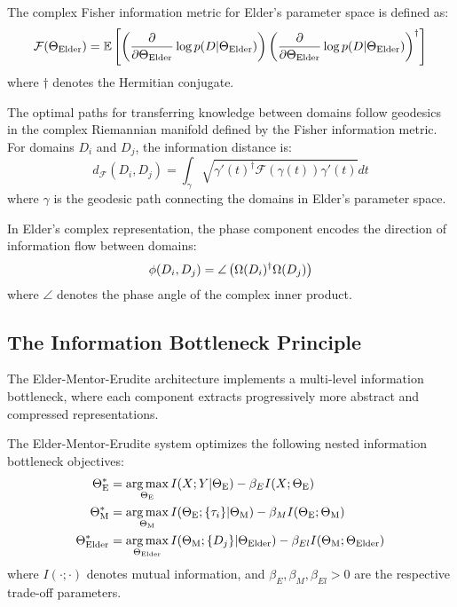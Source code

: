 \begin{definition}
The complex Fisher information metric for Elder's parameter space is defined as:
\begin{equation}
\mathcal{F}(\Theta_{\text{Elder}}) = \mathbb{E}\left[ \left(\frac{\partial}{\partial \Theta_{\text{Elder}}} \log p(D | \Theta_{\text{Elder}})\right) \left(\frac{\partial}{\partial \Theta_{\text{Elder}}} \log p(D | \Theta_{\text{Elder}})\right)^{\dagger} \right]
\end{equation}
where $\dagger$ denotes the Hermitian conjugate.
\end{definition}

\begin{theorem}
The optimal paths for transferring knowledge between domains follow geodesics in the complex Riemannian manifold defined by the Fisher information metric. For domains $D_i$ and $D_j$, the information distance is:
\begin{equation}
d_{\mathcal{F}}(D_i, D_j) = \int_{\gamma} \sqrt{\gamma'(t)^{\dagger} \mathcal{F}(\gamma(t)) \gamma'(t)} dt
\end{equation}
where $\gamma$ is the geodesic path connecting the domains in Elder's parameter space.
\end{theorem}

\begin{proposition}
In Elder's complex representation, the phase component encodes the direction of information flow between domains:
\begin{equation}
\phi(D_i, D_j) = \angle \left( \Omega(D_i)^{\dagger} \Omega(D_j) \right)
\end{equation}
where $\angle$ denotes the phase angle of the complex inner product.
\end{proposition}

\subsection{The Information Bottleneck Principle}

The Elder-Mentor-Erudite architecture implements a multi-level information bottleneck, where each component extracts progressively more abstract and compressed representations.

\begin{theorem}
The Elder-Mentor-Erudite system optimizes the following nested information bottleneck objectives:
\begin{align}
\Theta_{\text{E}}^* &= \mathop{\mathrm{arg\,max}}_{\Theta_{\text{E}}} I(X; Y | \Theta_{\text{E}}) - \beta_E I(X; \Theta_{\text{E}}) \\
\Theta_{\text{M}}^* &= \mathop{\mathrm{arg\,max}}_{\Theta_{\text{M}}} I(\Theta_{\text{E}}; \{\tau_i\} | \Theta_{\text{M}}) - \beta_M I(\Theta_{\text{E}}; \Theta_{\text{M}}) \\
\Theta_{\text{Elder}}^* &= \mathop{\mathrm{arg\,max}}_{\Theta_{\text{Elder}}} I(\Theta_{\text{M}}; \{D_j\} | \Theta_{\text{Elder}}) - \beta_{El} I(\Theta_{\text{M}}; \Theta_{\text{Elder}})
\end{align}
where $I(\cdot;\cdot)$ denotes mutual information, and $\beta_E, \beta_M, \beta_{El} > 0$ are the respective trade-off parameters.
\end{theorem}

